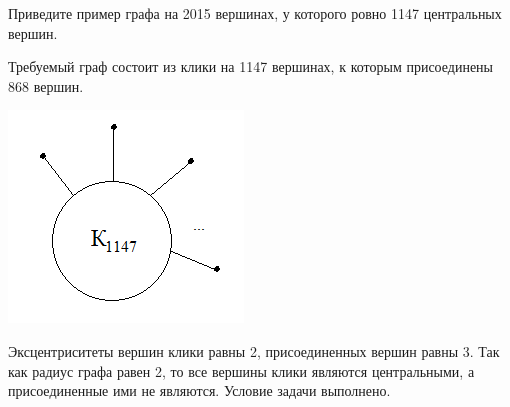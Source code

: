 \begin{task}{32}
Приведите пример графа на 2015 вершинах, у которого ровно 1147 центральных вершин.
\end{task}
\begin{solution}
Требуемый граф состоит из клики на 1147 вершинах, к которым присоединены 868 вершин.

\includegraphics{img/id32.png}

Эксцентриситеты вершин клики равны 2, присоединенных вершин равны 3. Так как радиус графа равен 2, то все вершины клики являются центральными, а присоединенные ими не являются. Условие задачи выполнено.
\end{solution}
